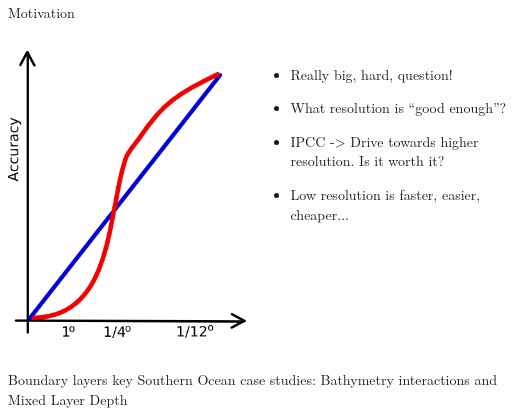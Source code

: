 \documentclass{beamer}
\begin{document}
\begin{frame}{Motivation}
 \begin{columns}[c]
\column{1.5in}
\includegraphics[width=1\textwidth]{accuracy_rez.png}\\
\column{3in}
\begin{itemize}
 \item Really big, hard, question!%
 \item What resolution is ``good enough''?
 \item IPCC -> Drive towards higher resolution. Is it worth it?
 \item Low resolution is faster, easier, cheaper...
\end{itemize}
\end{columns}
\pause
\begin{alertblock}{Boundary layers key}
    \centering Southern Ocean case studies: Bathymetry interactions and Mixed Layer Depth
\end{alertblock}
\end{frame}
\end{document}
